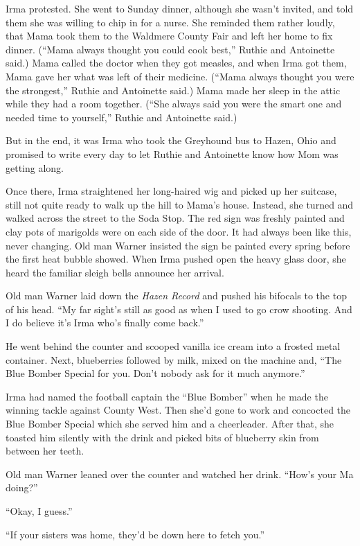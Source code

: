 \documentclass[
]{article}
\begin{document}
Irma protested. She went to Sunday dinner, although she wasn't invited,
and told them she was willing to chip in for a nurse. She reminded them
rather loudly, that Mama took them to the Waldmere County Fair and left
her home to fix dinner. (``Mama always thought you could cook best,''
Ruthie and Antoinette said.) Mama called the doctor when they got
measles, and when Irma got them, Mama gave her what was left of their
medicine. (``Mama always thought you were the strongest,'' Ruthie and
Antoinette said.) Mama made her sleep in the attic while they had a room
together. (``She always said you were the smart one and needed time to
yourself,'' Ruthie and Antoinette said.)

But in the end, it was Irma who took the Greyhound bus to Hazen, Ohio
and promised to write every day to let Ruthie and Antoinette know how
Mom was getting along.

Once there, Irma straightened her long-haired wig and picked up her
suitcase, still not quite ready to walk up the hill to Mama's house.
Instead, she turned and walked across the street to the Soda Stop. The
red sign was freshly painted and clay pots of marigolds were on each
side of the door. It had always been like this, never changing. Old man
Warner insisted the sign be painted every spring before the first heat
bubble showed. When Irma pushed open the heavy glass door, she heard the
familiar sleigh bells announce her arrival.

Old man Warner laid down the \emph{Hazen Record} and pushed his bifocals
to the top of his head. ``My far sight's still as good as when I used to
go crow shooting. And I do believe it's Irma who's finally come back.''

He went behind the counter and scooped vanilla ice cream into a frosted
metal container. Next, blueberries followed by milk, mixed on the
machine and, ``The Blue Bomber Special for you. Don't nobody ask for it
much anymore.''

Irma had named the football captain the ``Blue Bomber'' when he made the
winning tackle against County West. Then she'd gone to work and
concocted the Blue Bomber Special which she served him and a
cheerleader. After that, she toasted him silently with the drink and
picked bits of blueberry skin from between her teeth.

Old man Warner leaned over the counter and watched her drink. ``How's
your Ma doing?''

``Okay, I guess.''

``If your sisters was home, they'd be down here to fetch you.''
\end{document}
